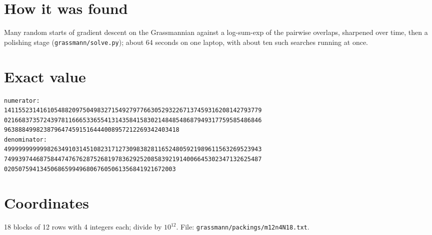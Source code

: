 \documentclass[11pt,a4paper]{article}
\begin{document}
\section{How it was found}
Many random starts of gradient descent on the Grassmannian against a log-sum-exp of the pairwise overlaps, sharpened over time, then a polishing stage (\texttt{grassmann/solve.py}); about 64 seconds on one laptop, with about ten such searches running at once.


\appendix
\section{Exact value}
{\small
\begin{verbatim}
numerator:
141155231416105488209750498327154927977663052932267137459316208142793779
021668373572439781166653365541314358415830214848548687949317759585486846
9638884998238796474591516444008957212269342403418
denominator:
499999999999826349103145108231712730983828116524805921989611563269523943
749939744687584474767628752681978362925208583921914006645302347132625487
020507594134506865994968067605061356841921672003
\end{verbatim}}

\section{Coordinates}
18 blocks of 12 rows with 4 integers each; divide by $10^{12}$. File: \texttt{grassmann/packings/m12n4N18.txt}.
{\tiny
\begin{multicols}{3}
\end{multicols}}
\end{document}
